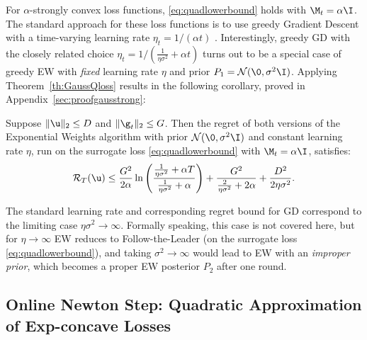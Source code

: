 \documentclass{colt2018} %
\newcommand{\normal}{\mathcal{N}}       %
\newcommand{\regret}{\mathcal{R}}
\begin{document}
For $\alpha$-strongly convex loss functions, \eqref{eq:quadlowerbound}
holds with $\M_t = \alpha \I$. The standard approach for these loss
functions is to use greedy Gradient Descent with a time-varying learning rate
$\eta_t = 1/(\alpha t)$ \citep{HazanAgarwalKale2007}. Interestingly, greedy GD with the closely
related choice $\eta_t = 1/(\tfrac{1}{\eta \sigma^2}+\alpha t)$ turns
out to be a special case of greedy EW with \emph{fixed} learning rate
$\eta$ and prior $P_1 = \normal(\0, \sigma^2 \I)$.
Applying Theorem~\ref{th:GaussQloss} results in the following corollary,
proved in Appendix~\ref{sec:proofgausstrong}:
% 
\begin{corollary}\label{lem:gausstongconvexloss}
Suppose $\|\u\|_2 \leq D$ and $\|\g_t\|_2 \leq G$. Then the regret of
both versions of the Exponential Weights algorithm with prior
$\normal(\0, \sigma^2\I)$ and constant learning rate $\eta$, run on the
surrogate loss \eqref{eq:quadlowerbound} with $\M_t = \alpha \I$,
satisfies:
% 
\[
   \regret_T(\u) \leq 
    \frac{G^2}{2\alpha}
    \ln \left(\frac{\tfrac{1}{\eta \sigma^2}+\alpha T}{
    \tfrac{1}{\eta \sigma^2}+\alpha}\right)
  + \frac{G^2}{\tfrac{2}{\eta \sigma^2} + 2\alpha}
  + \frac{D^2}{2\eta\sigma^2}.
\]
\end{corollary}
% 
The standard learning rate and corresponding regret bound for GD
\citep{HazanAgarwalKale2007} correspond to the limiting case $\eta
\sigma^2 \to \infty$. Formally speaking, this case is not covered here,
but for $\eta \to \infty$ EW reduces to Follow-the-Leader (on the
surrogate loss \eqref{eq:quadlowerbound}), and taking $\sigma^2 \to
\infty$ would lead to EW with an \emph{improper prior}, which becomes a
proper EW posterior $P_2$ after one round.
% 
% 
% 

\subsection{Online Newton Step: Quadratic Approximation of Exp-concave Losses}
\label{sec:ons}
\end{document}

